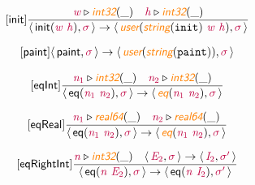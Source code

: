 \documentclass[10pt,leqno,fleqn]{article}
\newcommand{\artVariable}[1]{\mbox{\color{purple}\em #1\/}}
\newcommand{\artConstructor}[1]{\mbox{\sf #1}}
\newcommand{\artCaseInsensitiveLiteral}[1]{\mbox{\tt #1}}
\newcommand{\artSpecial}[1]{\mbox{\color{orange}\sf\em #1}}
\begin{document}
\begin{equation}
\tag*{[\artConstructor{\sf init}]}
\begin{split}\frac{ \artVariable{w}\triangleright \artSpecial{int32}(\_) \quad  \artVariable{h}\triangleright \artSpecial{int32}(\_) }{\langle\, \artConstructor{\sf init}(\artVariable{w}\ \artVariable{h}), \artVariable{$\sigma$}\,\rangle \rightarrow \langle\, \artSpecial{user}(\artSpecial{string}(\artCaseInsensitiveLiteral{init})\ \artVariable{w}\ \artVariable{h}), \artVariable{$\sigma$}\,\rangle }
\end{split}
\end{equation}

\begin{equation}
\tag*{[\artConstructor{\sf paint}]}
\begin{split}\langle\, \artConstructor{\sf paint}, \artVariable{$\sigma$}\,\rangle \rightarrow \langle\, \artSpecial{user}(\artSpecial{string}(\artCaseInsensitiveLiteral{paint})), \artVariable{$\sigma$}\,\rangle 
\end{split}
\end{equation}

\begin{equation}
\tag*{[\artConstructor{\sf eqInt}]}
\begin{split}\frac{ \artVariable{n$_{1}$}\triangleright \artSpecial{int32}(\_) \quad  \artVariable{n$_{2}$}\triangleright \artSpecial{int32}(\_) }{\langle\, \artConstructor{\sf eq}(\artVariable{n$_{1}$}\ \artVariable{n$_{2}$}), \artVariable{$\sigma$}\,\rangle \rightarrow \langle\, \artSpecial{eq}(\artVariable{n$_{1}$}\ \artVariable{n$_{2}$}), \artVariable{$\sigma$}\,\rangle }
\end{split}
\end{equation}

\begin{equation}
\tag*{[\artConstructor{\sf eqReal}]}
\begin{split}\frac{ \artVariable{n$_{1}$}\triangleright \artSpecial{real64}(\_) \quad  \artVariable{n$_{2}$}\triangleright \artSpecial{real64}(\_) }{\langle\, \artConstructor{\sf eq}(\artVariable{n$_{1}$}\ \artVariable{n$_{2}$}), \artVariable{$\sigma$}\,\rangle \rightarrow \langle\, \artSpecial{eq}(\artVariable{n$_{1}$}\ \artVariable{n$_{2}$}), \artVariable{$\sigma$}\,\rangle }
\end{split}
\end{equation}

\begin{equation}
\tag*{[\artConstructor{\sf eqRightInt}]}
\begin{split}\frac{ \artVariable{n}\triangleright \artSpecial{int32}(\_) \quad \langle\, \artVariable{E$_{2}$}, \artVariable{$\sigma$}\,\rangle \rightarrow \langle\, \artVariable{I$_{2}$}, \artVariable{$\sigma$\/$^\prime$}\,\rangle }{\langle\, \artConstructor{\sf eq}(\artVariable{n}\ \artVariable{E$_{2}$}), \artVariable{$\sigma$}\,\rangle \rightarrow \langle\, \artConstructor{\sf eq}(\artVariable{n}\ \artVariable{I$_{2}$}), \artVariable{$\sigma$\/$^\prime$}\,\rangle }
\end{split}
\end{equation}
\end{document}
